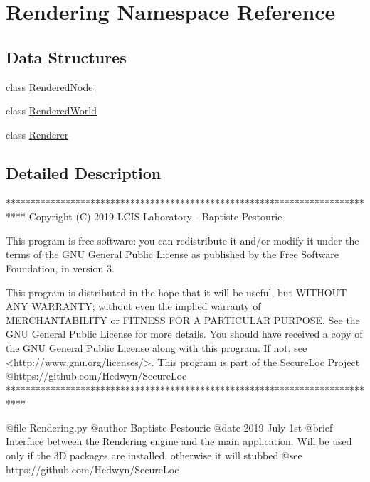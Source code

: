 \hypertarget{namespace_rendering}{}\section{Rendering Namespace Reference}
\label{namespace_rendering}
\subsection*{Data Structures}
\begin{DoxyCompactItemize}
\item 
class \mbox{\hyperlink{class_rendering_1_1_rendered_node}{Rendered\+Node}}
\item 
class \mbox{\hyperlink{class_rendering_1_1_rendered_world}{Rendered\+World}}
\item 
class \mbox{\hyperlink{class_rendering_1_1_renderer}{Renderer}}
\end{DoxyCompactItemize}


\subsection{Detailed Description}
\begin{DoxyVerb}****************************************************************************
Copyright (C) 2019 LCIS Laboratory - Baptiste Pestourie

This program is free software: you can redistribute it and/or modify
it under the terms of the GNU General Public License as published by
the Free Software Foundation, in version 3.

This program is distributed in the hope that it will be useful,
but WITHOUT ANY WARRANTY; without even the implied warranty of
MERCHANTABILITY or FITNESS FOR A PARTICULAR PURPOSE. See the
GNU General Public License for more details.
You should have received a copy of the GNU General Public License
along with this program. If not, see <http://www.gnu.org/licenses/>.
This program is part of the SecureLoc Project @https://github.com/Hedwyn/SecureLoc
 ****************************************************************************

@file Rendering.py
@author Baptiste Pestourie
@date 2019 July 1st
@brief Interface between the Rendering engine and the main application.
Will be used only if the 3D packages are installed, otherwise it will stubbed
@see https://github.com/Hedwyn/SecureLoc
\end{DoxyVerb}
 